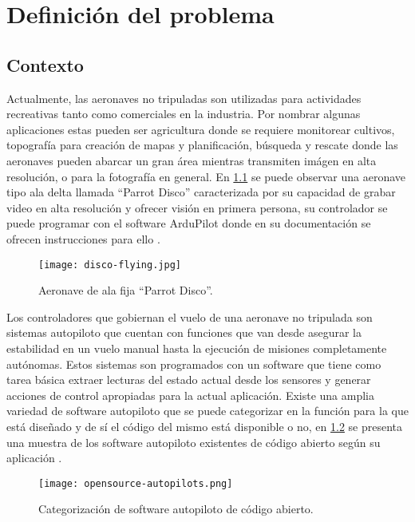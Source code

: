 \chapter{Definición del problema}

\section{Contexto}

Actualmente, las aeronaves no tripuladas son utilizadas para actividades recreativas tanto como comerciales en la industria. Por nombrar algunas aplicaciones estas pueden ser agricultura donde se requiere monitorear cultivos, topografía para creación de mapas y planificación, búsqueda y rescate donde las aeronaves pueden abarcar un gran área mientras transmiten imágen en alta resolución, o para la fotografía en general. En \cref{fig:disco} se puede observar una aeronave tipo ala delta llamada ``Parrot Disco'' caracterizada por su capacidad de grabar video en alta resolución y ofrecer visión en primera persona, su controlador se puede programar con el software ArduPilot donde en su documentación se ofrecen instrucciones para ello \cite{disco2}.

\begin{figure}[h]
    \centering
    \texttt{[image: disco-flying.jpg]}
    \caption{Aeronave de ala fija ``Parrot Disco''.}
    \label{fig:disco}
\end{figure}

Los controladores que gobiernan el vuelo de una aeronave no tripulada son sistemas autopiloto que cuentan con funciones que van desde asegurar la estabilidad en un vuelo manual hasta la ejecución de misiones completamente autónomas. Estos sistemas son programados con un software que tiene como tarea básica extraer lecturas del estado actual desde los sensores y generar acciones de control apropiadas para la actual aplicación. Existe una amplia variedad de software autopiloto que se puede categorizar en la función para la que está diseñado y de sí el código del mismo está disponible o no, en \cref{fig:opensource-autopilots} se presenta una muestra de los software autopiloto existentes de código abierto según su aplicación \cite{survey}.

\begin{figure}[h]
    \centering
    \texttt{[image: opensource-autopilots.png]}
    \caption{Categorización de software autopiloto de código abierto.}
    \label{fig:opensource-autopilots}
\end{figure}

